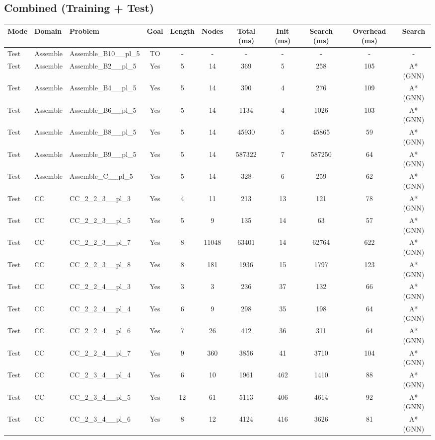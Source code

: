 \documentclass{article}
\begin{document}
\subsection*{Combined (Training + Test)}
\begin{tabular}{lllcccccccc}
\toprule
Mode & Domain & Problem & Goal & Length & Nodes & Total (ms) & Init (ms) & Search (ms) & Overhead (ms) & Search \\
\midrule
Test & Assemble & Assemble\_B10\_\_pl\_5 & TO & - & - & - & - & - & - & - \\
Test & Assemble & Assemble\_B2\_\_pl\_5 & Yes & 5 & 14 & 369 & 5 & 258 & 105 & A*(GNN) \\
Test & Assemble & Assemble\_B4\_\_pl\_5 & Yes & 5 & 14 & 390 & 4 & 276 & 109 & A*(GNN) \\
Test & Assemble & Assemble\_B6\_\_pl\_5 & Yes & 5 & 14 & 1134 & 4 & 1026 & 103 & A*(GNN) \\
Test & Assemble & Assemble\_B8\_\_pl\_5 & Yes & 5 & 14 & 45930 & 5 & 45865 & 59 & A*(GNN) \\
Test & Assemble & Assemble\_B9\_\_pl\_5 & Yes & 5 & 14 & 587322 & 7 & 587250 & 64 & A*(GNN) \\
Test & Assemble & Assemble\_C\_\_pl\_5 & Yes & 5 & 14 & 328 & 6 & 259 & 62 & A*(GNN) \\
Test & CC & CC\_2\_2\_3\_\_pl\_3 & Yes & 4 & 11 & 213 & 13 & 121 & 78 & A*(GNN) \\
Test & CC & CC\_2\_2\_3\_\_pl\_5 & Yes & 5 & 9 & 135 & 14 & 63 & 57 & A*(GNN) \\
Test & CC & CC\_2\_2\_3\_\_pl\_7 & Yes & 8 & 11048 & 63401 & 14 & 62764 & 622 & A*(GNN) \\
Test & CC & CC\_2\_2\_3\_\_pl\_8 & Yes & 8 & 181 & 1936 & 15 & 1797 & 123 & A*(GNN) \\
Test & CC & CC\_2\_2\_4\_\_pl\_3 & Yes & 3 & 3 & 236 & 37 & 132 & 66 & A*(GNN) \\
Test & CC & CC\_2\_2\_4\_\_pl\_4 & Yes & 6 & 9 & 298 & 35 & 198 & 64 & A*(GNN) \\
Test & CC & CC\_2\_2\_4\_\_pl\_6 & Yes & 7 & 26 & 412 & 36 & 311 & 64 & A*(GNN) \\
Test & CC & CC\_2\_2\_4\_\_pl\_7 & Yes & 9 & 360 & 3856 & 41 & 3710 & 104 & A*(GNN) \\
Test & CC & CC\_2\_3\_4\_\_pl\_4 & Yes & 6 & 10 & 1961 & 462 & 1410 & 88 & A*(GNN) \\
Test & CC & CC\_2\_3\_4\_\_pl\_5 & Yes & 12 & 61 & 5113 & 406 & 4614 & 92 & A*(GNN) \\
Test & CC & CC\_2\_3\_4\_\_pl\_6 & Yes & 8 & 12 & 4124 & 416 & 3626 & 81 & A*(GNN) \\

\end{tabular}
\end{document}
